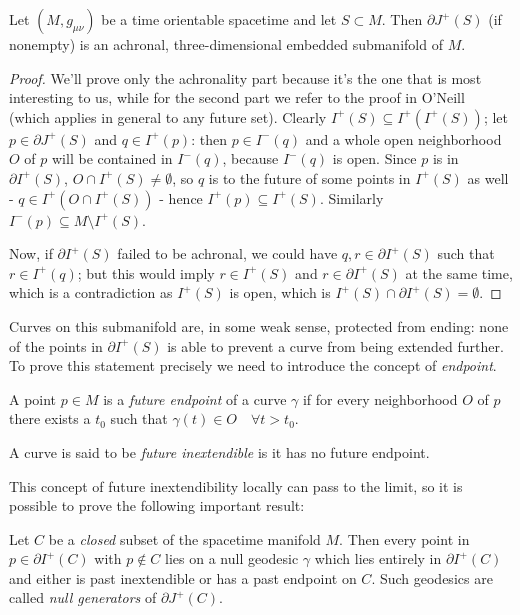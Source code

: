 \begin{theorem}
	Let \((M, g_{\mu\nu})\) be a time orientable spacetime and let \(S\subset M\). Then \(\partial J^+(S)\) (if nonempty) is an achronal, three-dimensional embedded submanifold of \(M\).
\end{theorem}
\begin{proof}
	We'll prove only the achronality part because it's the one that is most interesting to 
	us, while for the second part we refer to the proof in O'Neill~\cite{o1983semi} (which applies in general 
	to any future set). Clearly \(I^+(S) \subseteq I^+(I^+(S))\); 
	let \(p\in \partial J^+(S)\) and \(q \in I^+(p)\): then \(p \in I^-(q)\) and a whole open neighborhood \(O\)  of \(p\) will be contained in \(I^-(q)\), 
	because \(I^-(q)\) is open. 
	Since \(p\) is in \(\partial I^+(S)\), \(O \cap I^+(S) \neq \emptyset\), so \(q\) is to the future of some points in \(I^+(S)\) as well - \(q \in I^+(O \cap I^+(S)) \) -
	 hence \(I^+(p) \subseteq I^+(S)\). 
	 Similarly \(I^-(p) \subseteq M \setminus I^+(S)\).
	
	Now, if \(\partial I^+(S)\) failed to be achronal, we could have 
	\(q,r \in \partial I^+(S)\) such that \(r \in I^+(q)\); but this would imply 
	\(r \in I^+(S)\) and \(r \in \partial I^+(S)\) at the same time, which is a 
	contradiction as \(I^+(S)\) is open, which is 
	\(I^+(S) \cap \partial I^+(S) = \emptyset\).
\end{proof}
Curves on this submanifold are, in some weak sense, protected from ending: none of the points in \(\partial I^+(S)\) is able to prevent a curve from being extended further. To prove this statement precisely we need to introduce the concept of \emph{endpoint}.
	\begin{definition}
		A point \(p\in M\) is a \emph{future endpoint} of a curve \(\gamma\) if for every neighborhood \(O\) of \(p\) there exists a \(t_0\) such that \(\gamma(t) \in O \quad \forall t >t_0\). 
		
		A curve is said to be \emph{future inextendible} is it has no future endpoint.
	\end{definition}
	This concept of future inextendibility locally can pass to the limit, 
	so it is possible to prove the following important result:
\begin{theorem}
	\label{th:null-generator}
	Let \(C\) be a \emph{closed} subset of the spacetime manifold \(M\). 
	Then every point in \(p\in \partial I^+(C)\) with \(p \notin C\) lies on a null 
	geodesic \(\gamma\) which lies entirely in \(\partial I^+(C)\) and either is 
	past inextendible or has a past endpoint on \(C\). Such geodesics are called \emph{null generators} of \(\partial J^+(C)\).
\end{theorem}
